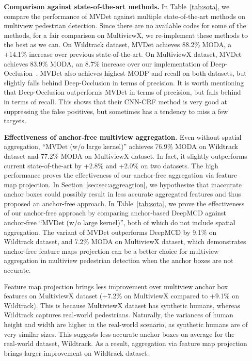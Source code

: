 \documentclass[runningheads]{llncs}
\begin{document}
\textbf{Comparison against state-of-the-art methods.}
In Table~\ref{tab:sota}, we compare the performance of MVDet against multiple state-of-the-art methods on multiview pedestrian detection. Since there are no available codes for some of the methods, for a fair comparison on MultiviewX, we re-implement these methods to the best as we can. 
On Wildtrack dataset, MVDet achieves 88.2\% MODA, a +14.1\% increase over previous state-of-the-art. On MultiviewX dataset, MVDet achieves 83.9\% MODA, an 8.7\% increase over our implementation of Deep-Occlusion~\cite{baque2017deep}. 
MVDet also achieves highest MODP and recall on both datasets, but slightly falls behind Deep-Occlusion in terms of precision. 
It is worth mentioning that Deep-Occlusion outperforms MVDet in terms of precision, but falls behind in terms of recall. This shows that their CNN-CRF method is very good at suppressing the false positives, but sometimes has a tendency to miss a few targets. 

\textbf{Effectiveness of anchor-free multiview aggregation.} 
Even without spatial aggregation, ``MVDet (w/o large kernel)'' achieves 76.9\% MODA on Wildtrack dataset and 77.2\% MODA on MultiviewX dataset. In fact, it slightly outperforms current state-of-the-art by +2.8\% and +2.0\% on two datasets. 
The high performance proves the effectiveness of our anchor-free aggregation via feature map projection. 
In Section~\ref{sec:sec:aggreagtion}, we hypothesize that inaccurate anchor boxes could possibly result in less accurate aggregated features and thus proposed an anchor-free approach. In Table~\ref{tab:sota}, we prove the effectiveness of our anchor-free approach by comparing anchor-based DeepMCD \cite{chavdarova2017deep} against anchor-free ``MVDet (w/o large kernel)'', both of which do not include spatial aggregation. The variant of MVDet outperforms DeepMCD by 9.1\% on Wildtrack dataset, and 7.2\% MODA on MultiviewX dataset, which demonstrates anchor-free feature maps projection can be a better choice for multiview aggregation in multiview pedestrian detection when the anchor boxes are not accurate. 


Feature map projection brings less improvement over multiview anchor box features on MultiviewX dataset (+7.2\% on MultiviewX compared to +9.1\% on Wildtrack). This is because MultiviewX dataset has synthetic humans, whereas Wildtrack captures real-world pedestrians. Naturally, the variances of human height and width are higher in the real-world scenario, as synthetic humans are of very similar sizes. This suggests less accurate anchor boxes on average for the real-world dataset, Wildtrack. As a result, aggregation via feature map projection brings larger improvement on Wildtrack dataset. 
\end{document}
